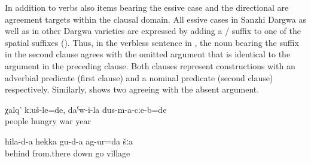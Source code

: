 In addition to verbs also items bearing the essive case and the directional are agreement targets within the clausal domain. All essive cases in Sanzhi Dargwa as well as in other Dargwa varieties are expressed by adding a / suffix to one of the spatial suffixes (). Thus, in the verbless sentence in , the noun bearing the  suffix  in the second clause agrees with the omitted  argument that is identical to the argument in the preceding clause. Both clauses represent  constructions with an adverbial predicate (first clause) and a nominal predicate (second clause) respectively. Similarly,  shows two  agreeing with the absent  argument.
%
\begin{exe}
	\ex	\label{ex:The people were hungry, it was during the years of war@12}
	\gll	χalq'	kːuš-le=de,	daˁw-i-la	dus-m-a-cːe-b=de\\
		people	hungry	war	year\\
	\glt	{}

	\ex	\label{ex:‎Back (reversing) from there we went down to the village}
	\gll	hila-d-a	hekka	gu-d-a	ag-ur=da	šːa\\
		behind	from.there	down	go	village\\
	\glt	{}
\end{exe}

